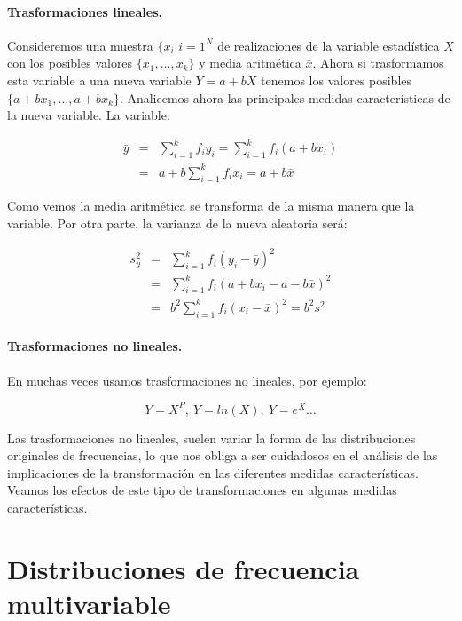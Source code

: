 \documentclass[12pt,a4paper]{book}
\begin{document}
\paragraph{Trasformaciones lineales.} 

Consideremos una muestra $\{ x_i \_{i=1}^N$ de realizaciones de la variable estadística $X$ con los posibles valores $\{ x_1, \ldots, x_k \}$ y media aritmética $\bar{x}$. Ahora si trasformamos esta variable a una nueva variable $Y = a + bX$ tenemos los valores posibles $\{ a +bx_1, \ldots, a + bx_k \}$. Analicemos ahora las principales medidas características de la nueva variable. La variable:

\begin{eqnarray}
\bar{y} & = & \sum_{i=1}^k f_i y_i =  \sum_{i=1}^k f_i (a + b x_i) \nonumber\\ 
        & = & a + b  \sum_{i=1}^k f_i x_i  = a + b \bar{x}
\end{eqnarray}


Como vemos la media aritmética se transforma de la misma manera que la variable. Por otra parte, la varianza de la nueva aleatoria será:

\begin{eqnarray}
s_y^2 & = & \sum_{i=1}^k f_i (y_i - \bar{y})^2 \nonumber\\
      & = & \sum_{i=1}^k f_i (a + bx_i -a -b\bar{x})^2 \nonumber\\
      & = & b^2 \sum_{i=1}^k f_i (x_i - \bar{x})^2 = b^2 s^2
\end{eqnarray}


\paragraph{Trasformaciones no lineales.}

En muchas veces usamos trasformaciones no lineales, por ejemplo:

$$ Y = X^P , \ Y = ln (X), \ Y = e^X \ldots $$

Las trasformaciones no lineales, suelen variar la forma de las distribuciones originales de frecuencias, lo que nos obliga a ser cuidadosos en el análisis de las implicaciones de la transformación en las diferentes medidas características. Veamos los efectos de este tipo de transformaciones en algunas medidas características.

\section{Distribuciones de frecuencia multivariable}
\end{document}

